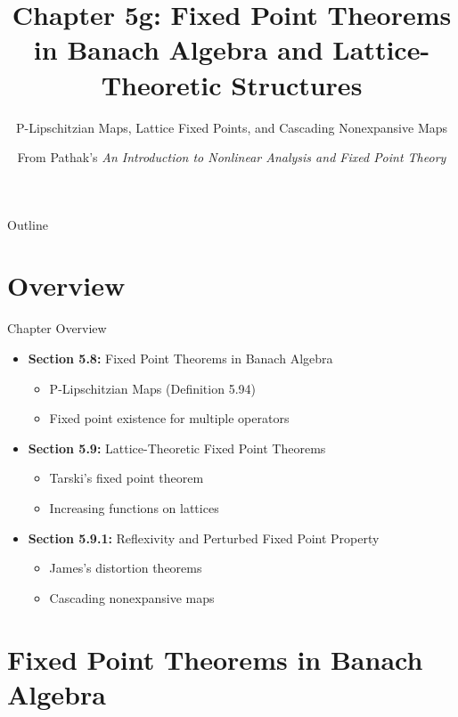 \documentclass[aspectratio=169,10pt]{beamer}
\title{Chapter 5g: Fixed Point Theorems in Banach Algebra and Lattice-Theoretic Structures}
\subtitle{P-Lipschitzian Maps, Lattice Fixed Points, and Cascading Nonexpansive Maps}
\author{From Pathak's \textit{An Introduction to Nonlinear Analysis and Fixed Point Theory}}
\date{}
\begin{document}
\frame{\titlepage}

\begin{frame}{Outline}
  \tableofcontents
\end{frame}

\section{Overview}

\begin{frame}{Chapter Overview}
  \begin{itemize}
    \item \textbf{Section 5.8:} Fixed Point Theorems in Banach Algebra
      \begin{itemize}
        \item P-Lipschitzian Maps (Definition 5.94)
        \item Fixed point existence for multiple operators
      \end{itemize}

    \vspace{0.3cm}

    \item \textbf{Section 5.9:} Lattice-Theoretic Fixed Point Theorems
      \begin{itemize}
        \item Tarski's fixed point theorem
        \item Increasing functions on lattices
      \end{itemize}

    \vspace{0.3cm}

    \item \textbf{Section 5.9.1:} Reflexivity and Perturbed Fixed Point Property
      \begin{itemize}
        \item James's distortion theorems
        \item Cascading nonexpansive maps
      \end{itemize}
  \end{itemize}
\end{frame}

\section{Fixed Point Theorems in Banach Algebra}
\end{document}
